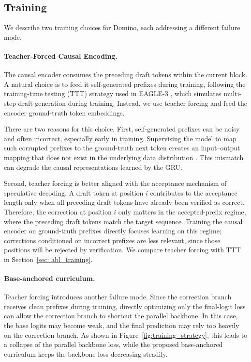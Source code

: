 \documentclass{llmxive}
\begin{document}
\subsection{Training}
\label{sec:training}
We describe two training choices for Domino, each addressing a different failure mode.
\paragraph{Teacher-Forced Causal Encoding.}
The causal encoder consumes the preceding draft tokens within the current block. A natural choice is to feed it self-generated prefixes during training, following the training-time testing (TTT) strategy used in EAGLE-3 \citep{li2025eagle3}, which simulates multi-step draft generation during training. Instead, we use teacher forcing and feed the encoder ground-truth token embeddings.

There are two reasons for this choice. First, self-generated prefixes can be noisy and often incorrect, especially early in training. Supervising the model to map such corrupted prefixes to the ground-truth next token creates an input--output mapping that does not exist in the underlying data distribution \citep{huszar2015not}. This mismatch can degrade the causal representations learned by the GRU.

Second, teacher forcing is better aligned with the acceptance mechanism of speculative decoding. A draft token at position \(i\) contributes to the acceptance length only when all preceding draft tokens have already been verified as correct. Therefore, the correction at position \(i\) only matters in the accepted-prefix regime, where the preceding draft tokens match the target sequence. Training the causal encoder on ground-truth prefixes directly focuses learning on this regime; corrections conditioned on incorrect prefixes are less relevant, since those positions will be rejected by verification. We compare teacher forcing with TTT in Section~\ref{sec: abl_training}.

\paragraph{Base-anchored curriculum.}
Teacher forcing introduces another failure mode. Since the correction branch receives clean prefixes during training, directly optimizing only the final-logit loss can allow the correction branch to shortcut the parallel backbone. In this case, the base logits may become weak, and the final prediction may rely too heavily on the correction branch. As shown in Figure~\ref{fig:training_strategy}, this leads to a collapse of the parallel backbone loss, while the proposed base-anchored curriculum keeps the backbone loss decreasing steadily.
\end{document}
